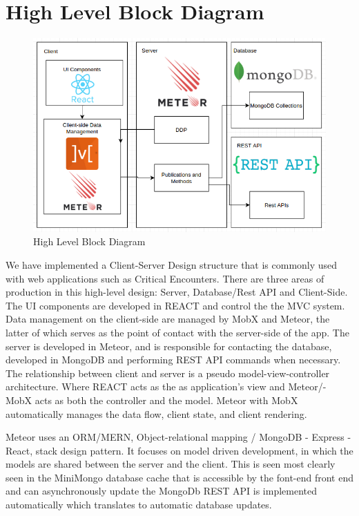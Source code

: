 \documentclass[letterpaper, 10 pt, conference]{ieeeconf}
\begin{document}
\section{High Level Block Diagram}
	\begin{figure}[H]
	\centering
	\centerline{\includegraphics[scale=.3]{high_level_block_diagram}}
	\caption{High Level Block Diagram}
	\label{fig: High Level Block Diagram }
	\end{figure}

We have implemented a Client-Server Design structure that is commonly used
with web applications such as Critical Encounters. There are three areas of production
in this high-level design: Server, Database/Rest API and Client-Side. The UI
components are developed in REACT and control the the MVC system.
Data management on the client-side are managed by MobX and Meteor, the
latter of which serves as the point of contact with the server-side of the app.
The server is developed in Meteor, and is responsible for contacting
the database, developed in MongoDB and performing REST API commands when
necessary.
The relationship between client and server is a pseudo model-view-controller
architecture. Where REACT acts as the as application’s view and Meteor/-
MobX acts as both the controller and the model. Meteor with MobX automatically manages the data flow, client state, and client rendering. \par
Meteor uses an ORM/MERN, Object-relational mapping / MongoDB
- Express - React, stack design pattern. It focuses on model driven development,
in which the models are shared between the server and the client. This
is seen most clearly seen in the MiniMongo database cache that is accessible by
the font-end front end and can asynchronously update the MongoDb REST API
is implemented automatically which translates to automatic database updates.
\end{document}
